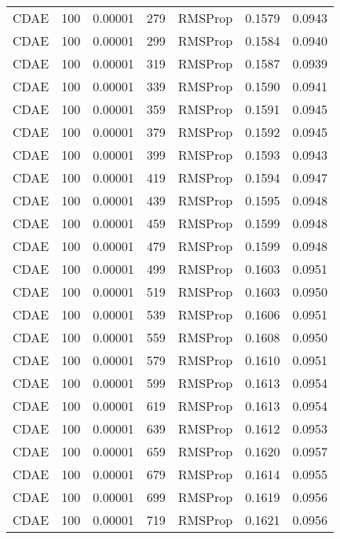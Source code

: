 \begin{tabular}{llrllrr}
    CDAE &  100 &  0.00001 &   279 &   RMSProp &  0.1579 &       0.0943 \\
    CDAE &  100 &  0.00001 &   299 &   RMSProp &  0.1584 &       0.0940 \\
    CDAE &  100 &  0.00001 &   319 &   RMSProp &  0.1587 &       0.0939 \\
    CDAE &  100 &  0.00001 &   339 &   RMSProp &  0.1590 &       0.0941 \\
    CDAE &  100 &  0.00001 &   359 &   RMSProp &  0.1591 &       0.0945 \\
    CDAE &  100 &  0.00001 &   379 &   RMSProp &  0.1592 &       0.0945 \\
    CDAE &  100 &  0.00001 &   399 &   RMSProp &  0.1593 &       0.0943 \\
    CDAE &  100 &  0.00001 &   419 &   RMSProp &  0.1594 &       0.0947 \\
    CDAE &  100 &  0.00001 &   439 &   RMSProp &  0.1595 &       0.0948 \\
    CDAE &  100 &  0.00001 &   459 &   RMSProp &  0.1599 &       0.0948 \\
    CDAE &  100 &  0.00001 &   479 &   RMSProp &  0.1599 &       0.0948 \\
    CDAE &  100 &  0.00001 &   499 &   RMSProp &  0.1603 &       0.0951 \\
    CDAE &  100 &  0.00001 &   519 &   RMSProp &  0.1603 &       0.0950 \\
    CDAE &  100 &  0.00001 &   539 &   RMSProp &  0.1606 &       0.0951 \\
    CDAE &  100 &  0.00001 &   559 &   RMSProp &  0.1608 &       0.0950 \\
    CDAE &  100 &  0.00001 &   579 &   RMSProp &  0.1610 &       0.0951 \\
    CDAE &  100 &  0.00001 &   599 &   RMSProp &  0.1613 &       0.0954 \\
    CDAE &  100 &  0.00001 &   619 &   RMSProp &  0.1613 &       0.0954 \\
    CDAE &  100 &  0.00001 &   639 &   RMSProp &  0.1612 &       0.0953 \\
    CDAE &  100 &  0.00001 &   659 &   RMSProp &  0.1620 &       0.0957 \\
    CDAE &  100 &  0.00001 &   679 &   RMSProp &  0.1614 &       0.0955 \\
    CDAE &  100 &  0.00001 &   699 &   RMSProp &  0.1619 &       0.0956 \\
    CDAE &  100 &  0.00001 &   719 &   RMSProp &  0.1621 &       0.0956 \\

\end{tabular}
